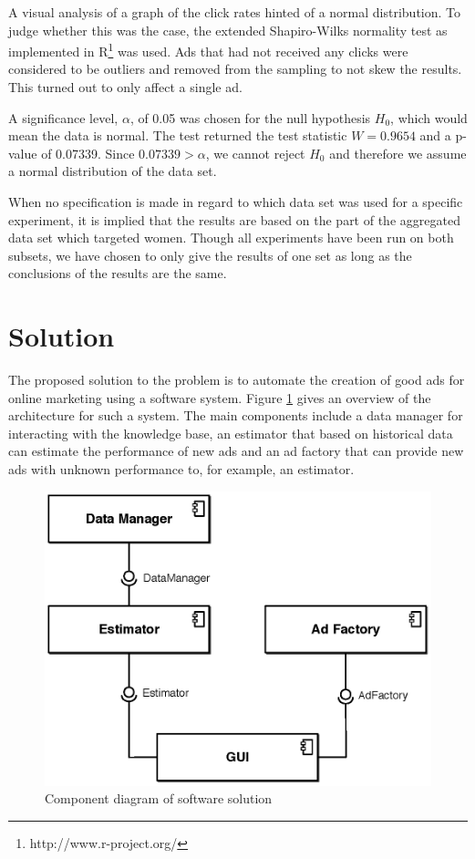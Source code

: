 \documentclass{sig-alternate}
\begin{document}
A visual analysis of a graph of the click rates hinted of a normal distribution. To judge whether this was the case, the extended Shapiro-Wilks normality test \citep{Royston1982} as implemented in R\footnote{http://www.r-project.org/} was used. Ads that had not received any clicks were considered to be outliers and removed from the sampling to not skew the results. This turned out to only affect a single ad.

A significance level, \(\alpha\), of 0.05 was chosen for the null hypothesis \(H_0\), which would mean the data is normal. The test returned the test statistic \(W = 0.9654\) and a p-value of 0.07339. Since \(0.07339 > \alpha\), we cannot reject \(H_0\) and therefore we assume a normal distribution of the data set.

When no specification is made in regard to which data set was used for a specific experiment, it is implied that the results are based on the part of the aggregated data set which targeted women. Though all experiments have been run on both subsets, we have chosen to only give the results of one set as long as the conclusions of the results are the same.

\section{Solution}
\label{ch:Solution}
The proposed solution to the problem is to automate the creation of good ads for online marketing using a software system. Figure \ref{fig:SWArchitecture} gives an overview of the architecture for such a system. The main components include a data manager for interacting with the knowledge base, an estimator that based on historical data can estimate the performance of new ads and an ad factory that can provide new ads with unknown performance to, for example, an estimator.

\begin{figure}[htpb]
	\centering
	\includegraphics[width=\columnwidth]{sw-architecture.eps}
	\caption{Component diagram of software solution}
	\label{fig:SWArchitecture}
\end{figure}
\end{document}
